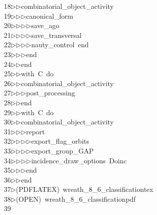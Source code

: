 \begin{tabbing}
18\>$\triangleright$\>$\triangleright$\>combinatorial\_object\_activity\ \\[0pt]
19\>$\triangleright$\>$\triangleright$\>$\triangleright$\>canonical\_form\ \\[0pt]
20\>$\triangleright$\>$\triangleright$\>$\triangleright$\>$\triangleright$\>save\_ago\ \\[0pt]
21\>$\triangleright$\>$\triangleright$\>$\triangleright$\>$\triangleright$\>save\_transversal\ \\[0pt]
22\>$\triangleright$\>$\triangleright$\>$\triangleright$\>$\triangleright$\>nauty\_control\ end\ \\[0pt]
23\>$\triangleright$\>$\triangleright$\>$\triangleright$\>end\ \\[0pt]
24\>$\triangleright$\>$\triangleright$\>end\ \\[0pt]
25\>$\triangleright$\>$\triangleright$\>with\ C\ do\ \\[0pt]
26\>$\triangleright$\>$\triangleright$\>combinatorial\_object\_activity\ \\[0pt]
27\>$\triangleright$\>$\triangleright$\>$\triangleright$\>post\_processing\ \\[0pt]
28\>$\triangleright$\>$\triangleright$\>end\ \\[0pt]
29\>$\triangleright$\>$\triangleright$\>with\ C\ do\ \\[0pt]
30\>$\triangleright$\>$\triangleright$\>combinatorial\_object\_activity\ \\[0pt]
31\>$\triangleright$\>$\triangleright$\>$\triangleright$\>report\ \\[0pt]
32\>$\triangleright$\>$\triangleright$\>$\triangleright$\>$\triangleright$\>export\_flag\_orbits\ \\[0pt]
33\>$\triangleright$\>$\triangleright$\>$\triangleright$\>$\triangleright$\>export\_group\_GAP\ \\[0pt]
34\>$\triangleright$\>$\triangleright$\>$\triangleright$\>$\triangleright$\>incidence\_draw\_options\ Doinc\ \\[0pt]
35\>$\triangleright$\>$\triangleright$\>$\triangleright$\>end\ \\[0pt]
36\>$\triangleright$\>$\triangleright$\>end\\[0pt]
37\>$\triangleright$\>(PDFLATEX)\ wreath\_8\_6\_classificationtex\\[0pt]
38\>$\triangleright$\>(OPEN)\ wreath\_8\_6\_classificationpdf\\[0pt]
39\>\end{tabbing}
